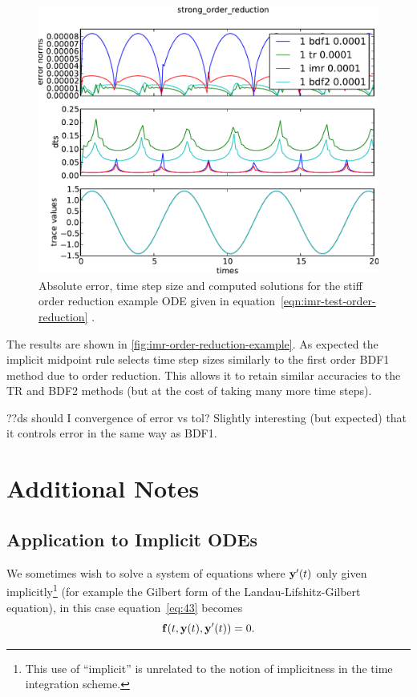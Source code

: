 \begin{figure}[h!]
  \centering  \includegraphics[width=1\textwidth]{aimr/strong_order_reduction-errornormsvs-dtsvs-tracevaluesvstimes}
  \caption{Absolute error, time step size and computed solutions for the stiff order reduction example ODE given in equation~\eqref{eqn:imr-test-order-reduction}
.}
  \label{fig:imr-order-reduction-example}
\end{figure}

The results are shown in \autoref{fig:imr-order-reduction-example}. 
As expected the implicit midpoint rule selects time step sizes similarly to the first order BDF1 method due to order reduction.
This allows it to retain similar accuracies to the TR and BDF2 methods (but at the cost of taking many more time steps).


??ds should I convergence of error vs tol? Slightly interesting (but expected) that it controls error in the same way as BDF1.



\section{Additional Notes}

\subsection{Application to Implicit ODEs}
\label{sec:extens-impl-odes}

We sometimes wish to solve a system of equations where $\mathbf{y}'(t)$ only given implicitly\footnote{This use of ``implicit'' is unrelated to the notion of implicitness in the time integration scheme.} (for example the Gilbert form of the Landau-Lifshitz-Gilbert equation), in this case equation~\eqref{eq:43} becomes
\begin{equation}
  {\mathbf{f}{\left( t, \mathbf{y}(t), \mathbf{y}'(t) \right)}} = 0.
\end{equation}

